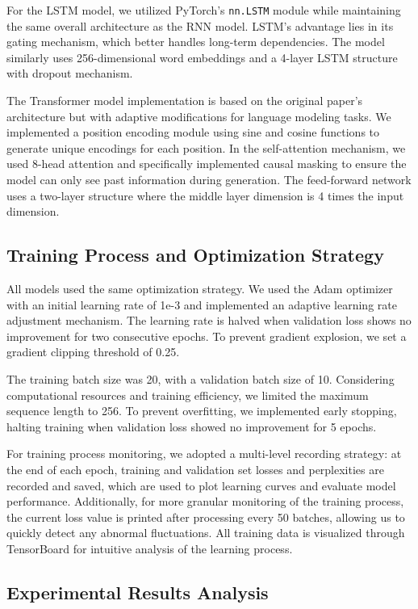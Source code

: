 \documentclass[12pt,oneside]{article}
\begin{document}
For the LSTM model, we utilized PyTorch's \texttt{nn.LSTM} module while maintaining the same overall architecture as the RNN model. LSTM's advantage lies in its gating mechanism, which better handles long-term dependencies. The model similarly uses 256-dimensional word embeddings and a 4-layer LSTM structure with dropout mechanism.

The Transformer model implementation is based on the original paper's architecture but with adaptive modifications for language modeling tasks. We implemented a position encoding module using sine and cosine functions to generate unique encodings for each position. In the self-attention mechanism, we used 8-head attention and specifically implemented causal masking to ensure the model can only see past information during generation. The feed-forward network uses a two-layer structure where the middle layer dimension is 4 times the input dimension.

\subsection{Training Process and Optimization Strategy}

All models used the same optimization strategy. We used the Adam optimizer with an initial learning rate of 1e-3 and implemented an adaptive learning rate adjustment mechanism. The learning rate is halved when validation loss shows no improvement for two consecutive epochs. To prevent gradient explosion, we set a gradient clipping threshold of 0.25.

The training batch size was 20, with a validation batch size of 10. Considering computational resources and training efficiency, we limited the maximum sequence length to 256. To prevent overfitting, we implemented early stopping, halting training when validation loss showed no improvement for 5 epochs.

For training process monitoring, we adopted a multi-level recording strategy: at the end of each epoch, training and validation set losses and perplexities are recorded and saved, which are used to plot learning curves and evaluate model performance. Additionally, for more granular monitoring of the training process, the current loss value is printed after processing every 50 batches, allowing us to quickly detect any abnormal fluctuations. All training data is visualized through TensorBoard for intuitive analysis of the learning process.

\subsection{Experimental Results Analysis}
\end{document}
